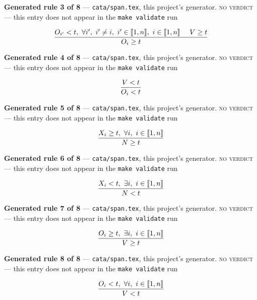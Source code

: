 \documentclass[10pt,a4paper]{article}
\newcommand{\rulebox}[1]{%
  \[\resizebox{\ifdim\width>\linewidth\linewidth\else\width\fi}{!}%
    {$\displaystyle #1$}\]}
\begin{document}
{\small\textbf{Generated rule 3 of 8} --- \texttt{cata/span.tex}, this project's generator. \textsc{no verdict} --- this entry does not appear in the \texttt{make validate} run\par}
\rulebox{\frac{O_{i'}<t,~\forall i',~i' \neq i,~i' \in \llbracket1,n\rrbracket,~i \in \llbracket1,n\rrbracket~~~~V \geq t}{O_{i} \geq t}}

{\small\textbf{Generated rule 4 of 8} --- \texttt{cata/span.tex}, this project's generator. \textsc{no verdict} --- this entry does not appear in the \texttt{make validate} run\par}
\rulebox{\frac{V<t}{O_{i}<t}}

{\small\textbf{Generated rule 5 of 8} --- \texttt{cata/span.tex}, this project's generator. \textsc{no verdict} --- this entry does not appear in the \texttt{make validate} run\par}
\rulebox{\frac{X_{i} \geq t,~\forall i,~i \in \llbracket1,n\rrbracket}{N \geq t}}

{\small\textbf{Generated rule 6 of 8} --- \texttt{cata/span.tex}, this project's generator. \textsc{no verdict} --- this entry does not appear in the \texttt{make validate} run\par}
\rulebox{\frac{X_{i}<t,~\exists i,~i \in \llbracket1,n\rrbracket}{N<t}}

{\small\textbf{Generated rule 7 of 8} --- \texttt{cata/span.tex}, this project's generator. \textsc{no verdict} --- this entry does not appear in the \texttt{make validate} run\par}
\rulebox{\frac{O_{i} \geq t,~\exists i,~i \in \llbracket1,n\rrbracket}{V \geq t}}

{\small\textbf{Generated rule 8 of 8} --- \texttt{cata/span.tex}, this project's generator. \textsc{no verdict} --- this entry does not appear in the \texttt{make validate} run\par}
\rulebox{\frac{O_{i}<t,~\forall i,~i \in \llbracket1,n\rrbracket}{V<t}}
\end{document}
